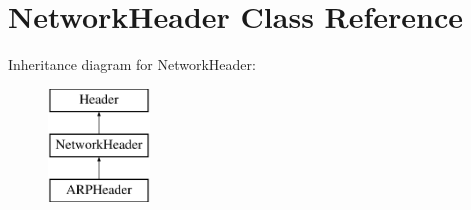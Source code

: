 \hypertarget{class_network_header}{\section{Network\-Header Class Reference}
\label{class_network_header}
}
Inheritance diagram for Network\-Header\-:\begin{figure}[H]
\begin{center}
\leavevmode
\includegraphics[height=3.000000cm]{class_network_header}
\end{center}
\end{figure}
